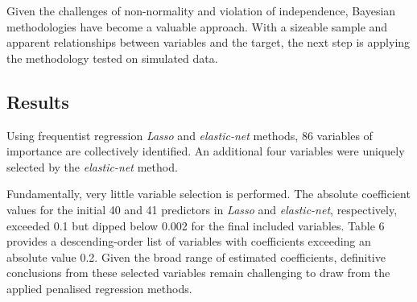 \documentclass[
  11pt,
]{article}
\begin{document}
Given the challenges of non-normality and violation of independence,
Bayesian methodologies have become a valuable approach. With a sizeable
sample and apparent relationships between variables and the target, the
next step is applying the methodology tested on simulated data.

\subsection{Results}

Using frequentist regression \emph{Lasso} and \emph{elastic-net}
methods, 86 variables of importance are collectively identified. An
additional four variables were uniquely selected by the
\emph{elastic-net} method.

Fundamentally, very little variable selection is performed. The absolute
coefficient values for the initial 40 and 41 predictors in \emph{Lasso}
and \emph{elastic-net}, respectively, exceeded 0.1 but dipped below
0.002 for the final included variables. Table 6 provides a
descending-order list of variables with coefficients exceeding an
absolute value 0.2. Given the broad range of estimated coefficients,
definitive conclusions from these selected variables remain challenging
to draw from the applied penalised regression methods.
\end{document}
